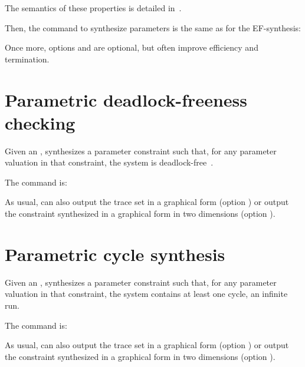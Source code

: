 The semantics of these properties is detailed in~\cite{Andre13ICECCS}.

Then, the command to synthesize parameters is the same as for the EF-synthesis:


Once more, options  and  are optional, but often improve efficiency and termination.


\section{Parametric deadlock-freeness checking}\label{ss:mode:PDFC}

Given an \NIPTA{}, \PDFC{} synthesizes a parameter constraint such that, for any parameter valuation in that constraint, the system is deadlock-free~\cite{Andre16}.

The command is:


As usual, \imitator{} can also
	output the trace set in a graphical form (option )
	or
	output the constraint synthesized in a graphical form in two dimensions (option ).


\section{Parametric cycle synthesis}\label{ss:mode:LoopSynth}

Given an \NIPTA{}, \imitator{} synthesizes a parameter constraint such that, for any parameter valuation in that constraint, the system contains at least one cycle, \ie{} an infinite run. %

The command is:


As usual, \imitator{} can also
	output the trace set in a graphical form (option )
	or
	output the constraint synthesized in a graphical form in two dimensions (option ).



